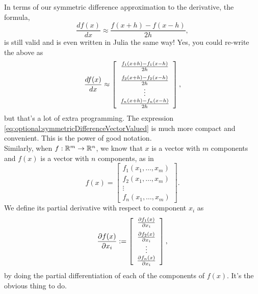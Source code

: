 In terms of our symmetric difference approximation to the derivative, the formula,
\begin{equation}
\label{eq:optional:symmetricDifferenceVectorValued}
   \frac{df(x)}{dx}\approx \frac{f(x + h)- f(x-  h)}{2 h},
\end{equation}
is still valid and is even written in Julia the same way! Yes, you could re-write the above as
\begin{equation}
\label{eq:optional:symmetricDifferenceVectorValued02}
   \frac{df(x)}{dx}\approx \left[\begin{array}{c}
     \frac{f_1(x + h)- f_1(x-  h)}{2 h} \medskip \\
      \frac{f_2(x + h)- f_2(x-  h)}{2 h} \\
       \vdots\\
      \frac{f_n(x + h)- f_n(x-  h)}{2 h}
    \end{array} \right],
\end{equation}
 but that's a lot of extra programming. The expression \eqref{eq:optional:symmetricDifferenceVectorValued} is much more compact and convenient. This is the power of good notation.\\

Similarly, when $f:\mathbb R^m \to \mathbb R^n$, we know that $x$ is a vector with $m$ components and $f(x)$ is a vector with $n$ components, as in 
\begin{equation}
    \label{eq:optional:VectorFunctionsA}
    f(x) = \left[\begin{array}{c}
       f_1(x_1, \ldots, x_m) \\
       f_2(x_1, \ldots, x_m) \\
       \vdots\\
       f_n(x_1, \ldots, x_m) 
    \end{array} \right].
\end{equation}
We define its partial derivative with respect to component $x_i$ as
\begin{equation}
    \label{eq:optional:VectorFunctionsB}
    \frac{\partial f(x)}{\partial x_i} := \left[\begin{array}{c}
      \frac{\partial f_1(x)}{\partial x_i} \medskip \\
       \frac{\partial f_2(x)}{\partial x_i} \\
       \vdots\\
      \frac{\partial f_n(x)}{\partial x_i}
    \end{array} \right],
\end{equation}
by doing the partial differentiation of each of the components of $f(x)$. It's the obvious thing to do. \\

